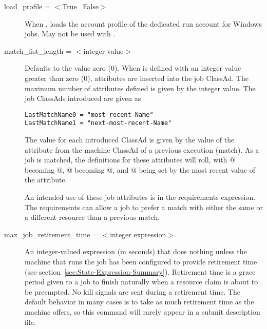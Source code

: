 \begin{description}

\item[load\_profile = $<$True \Bar\ False$>$]
When , loads the account profile of the dedicated run account for
Windows jobs.
May not be used with .


\item[match\_list\_length = $<$integer value$>$]
Defaults to the value zero (0).
When  is defined with an integer value
greater than zero (0),
attributes are inserted into the job ClassAd.
The maximum number of attributes defined is given by the integer
value.
The job ClassAds introduced are given as
\begin{verbatim}
LastMatchName0 = "most-recent-Name"
LastMatchName1 = "next-most-recent-Name"
\end{verbatim}

The value for each introduced ClassAd is given by the
value of the  attribute
from the machine ClassAd of a previous execution (match).
As a job is matched, the definitions for these attributes
will roll,
with @ becoming @,
@ becoming @,
and @ being set by the most recent
value of the  attribute.

An intended use of
these job attributes is in the requirements expression.
The requirements can allow a job to prefer a match with either the same
or a different resource than a previous match.



\item[max\_job\_retirement\_time = $<$integer expression$>$]
An integer-valued expression (in seconds) that
does nothing unless the machine that runs the job has been configured
to provide retirement time
(see section~\ref{sec:State-Expression-Summary}).
Retirement time is a
grace period given to a job to finish naturally
when a resource claim is about to be preempted.
No kill signals are sent during a retirement time.
The default behavior in many cases is to take as much
retirement time as the machine offers,
so this command will rarely appear in a submit description file.


\end{description}
